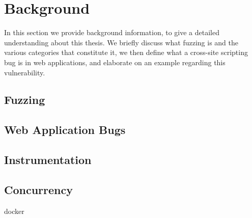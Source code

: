 \chapter{Background}
\label{sec:background}
\minitoc
\vspace*{1cm}

In this section we provide background information, to give a
detailed understanding about this thesis. We briefly discuss
what fuzzing is and the various categories that constitute
it, we then define what a cross-site scripting bug is in web
applications, and elaborate on an example regarding this
vulnerability.

\section{Fuzzing}


\section{Web Application Bugs}


\section{Instrumentation}

\section{Concurrency}

docker